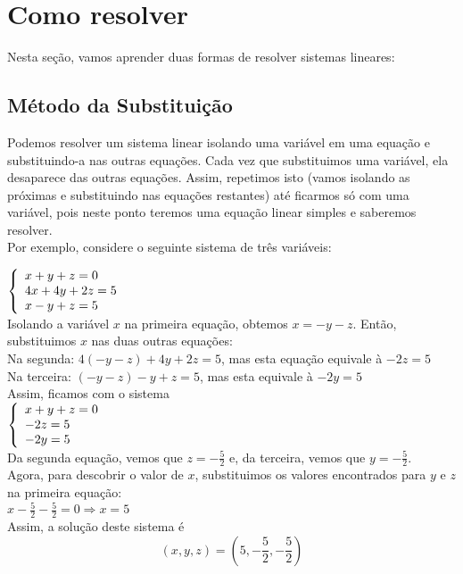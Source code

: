 \documentclass[a4paper,12pt]{article}
\begin{document}
\section{Como resolver}
    Nesta seção, vamos aprender duas formas de resolver sistemas lineares:
    
    \subsection{Método da Substituição}
    Podemos resolver um sistema linear isolando uma variável em uma equação e substituindo-a nas outras equações. Cada vez que substituimos uma variável, ela desaparece das outras equações. Assim, repetimos isto (vamos isolando as próximas e substituindo nas equações restantes) até ficarmos só com uma variável, pois neste ponto teremos uma equação linear simples e saberemos resolver. \\
    Por exemplo, considere o seguinte sistema de três variáveis:
    
$ 
\left\{
\begin{array}{ll}
\displaystyle x + y + z = 0 \\
\displaystyle 4x + 4y  + 2z = 5 \\
\displaystyle  x -y + z = 5
\end{array}
\right.\\
$
   \\
   Isolando a variável $x$ na primeira equação, obtemos $x = -y - z$. Então, substituimos $x$ nas duas outras equações: \\
   Na segunda: $4(-y - z) + 4y + 2z = 5$, mas esta equação equivale à $-2z = 5$ \\
   Na terceira: $(-y -z) -y + z = 5$, mas esta equivale à $-2y = 5$ \\
    Assim, ficamos com o sistema \\
$ 
\left\{
\begin{array}{ll}
\displaystyle x + y + z = 0 \\
\displaystyle -2z = 5 \\
\displaystyle -2y = 5 \\
\end{array}
\right.\\
$
   \\
 
 Da segunda equação, vemos que $z = -\frac{5}{2}$ e, da terceira, vemos que $y = -\frac{5}{2}$.\\
 Agora, para descobrir o valor de $x$, substituimos os valores encontrados para $y$ e $z$ na primeira equação: \\
  $x -\frac{5}{2}  -\frac{5}{2} = 0 \Rightarrow x = 5$ \\
  Assim, a solução deste sistema é
  $$(x, y, z) = (5, -\frac{5}{2}, -\frac{5}{2}) $$
   
\end{document}
